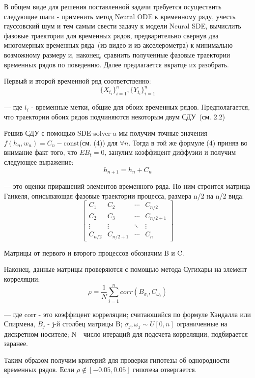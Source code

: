 \documentclass{article}
\begin{document}
   \par В общем виде для решения поставленной задачи требуется осуществить следующие шаги - применить метод Neural ODE к временному ряду, учесть гауссовский шум и тем самым свести задачу к модели Neural SDE, вычислить фазовые траектории для временных рядов, предварительно свернув два многомерных временных ряда~(из видео и из акселерометра) к минимально возможному размеру и, наконец, сравнить полученные фазовые траектории временных рядов по поведению. Далее предлагается вкратце их разобрать.
   \par Первый и второй временной ряд соответственно: \begin{equation}\{X_{t_i}\}_{i=1}^n,\{Y_{t_i}\}_{i=1}^n \end{equation} \par --- где $t_i$ - временные метки, общие для обоих временных рядов. Предполагается, что траектории обоих рядов подчиняются некоторым двум СДУ~(см. 2.2)
   \par Решив СДУ с помощью SDE-solver-a мы получим точные значения $f(h_n,w_n)= C_n-\text{const}$(см. (4)) для $\forall n$. Тогда в той же формуле (4) приняв во внимание факт того, что $E B_t=0$, занулим коэффицент диффузии и получим следующее выражение:
   \begin{equation} h_{n+1} = h_n + C_n    \end{equation}
   \par --- это оценки приращений элементов временного ряда. По ним строится матрица Ганкеля, описывающая фазовые траектории процесса, размера n/2 на n/2 вида:
    \begin{equation}
 \begin{bmatrix}
   C_1 & C_2 & \cdots & C_{n/2} \\
   C_2 & C_3 & \cdots & C_{n/2+1} \\
   \vdots  & \vdots  & \ddots & \vdots  \\
   C_{n/2} & C_{n/2+1} & \cdots & C_{n} 
 \end{bmatrix}
\end{equation}
   \par Матрицы от первого и второго процессов обозначим B и C.
   \par Наконец, данные матрицы проверяются с помощью метода Сугихары на элемент корреляции: 
   \begin{equation}  \rho = \frac{1}{N} \sum_{i=1}^n corr(B_{\sigma_i}, C_{\omega_i})  \end{equation}
   \par --- где corr - это коэффицент корреляции; считающийся по формуле Кэндалла или Спирмена, $B_j$ - j-й столбец матрицы B; $\sigma_j, \omega_j \sim U[0,n] $ ограниченные на дискретном носителе; N - число итераций для подсчета корреляции, подбирается заранее.
   \par Таким образом получим критерий для проверки гипотезы об однородности временных рядов. Если $\rho \notin [-0.05,0.05]$ гипотеза отвергается.
\end{document}
